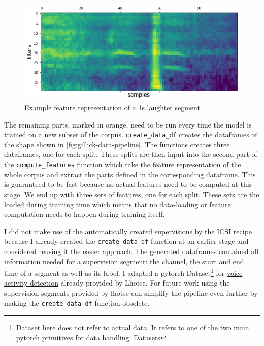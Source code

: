 \documentclass[bsc,frontabs,parskip,deptreport]{infthesis}
\begin{document}
\begin{figure}[]
    \centering
    \includegraphics[width=14cm]{imgs/sample_fbank_feat.png}
    \caption{Example feature representation of a 1s laughter segment}
    \label{fig:feature-sample}
\end{figure}

The remaining parts, marked in orange, need to be run every time the model is trained on a new subset of the corpus.
\verb|create_data_df| creates the dataframes of the shape shown in \autoref{fig:gillick-data-pipeline}. 
The functions creates three dataframes, one for each split. 
These splits are then input into the second part of the \verb|compute_features| function which take the feature representation of the whole corpus and extract the parts defined in the corresponding dataframe. This is guaranteed to be fast because no actual features need to be computed at this stage.
We end up with three sets of features, one for each split. 
These sets are the loaded during training time which means that no data-loading or feature computation needs to happen during training itself.


I did not make use of the automatically created supervisions by the ICSI recipe because I already created the \verb|create_data_df| function at an earlier stage and considered reusing it the easier approach.
The generated dataframes contained all information needed for a supervision segment: the channel, the start and end time of a segment as well as its label. 
I adapted a pytorch Dataset\footnote{Dataset here does not refer to actual data. It refers to one of the two main pytorch primitives for data handling: \href{https://pytorch.org/tutorials/beginner/basics/data_tutorial.html}{Datasets}} for \href{https://lhotse.readthedocs.io/en/latest/datasets.html#lhotse.dataset.vad.VadDataset}{voice activity detection} already provided by Lhotse.
For future work using the supervision segments provided by lhotse can simplify the pipeline even further by making the \verb|create_data_df| function obsolete. 
\end{document}
